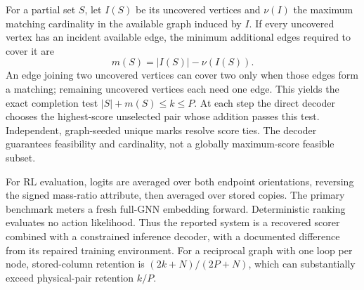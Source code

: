 For a partial set $S$, let $I(S)$ be its uncovered vertices and $\nu(I)$ the maximum matching cardinality in the available graph induced by $I$. If every uncovered vertex has an incident available edge, the minimum additional edges required to cover it are
\begin{equation}
 m(S)=|I(S)|-\nu(I(S)).
\end{equation}
An edge joining two uncovered vertices can cover two only when those edges form a matching; remaining uncovered vertices each need one edge. This yields the exact completion test $|S|+m(S)\le k\le P$. At each step the direct decoder chooses the highest-score unselected pair whose addition passes this test. Independent, graph-seeded unique marks resolve score ties. The decoder guarantees feasibility and cardinality, not a globally maximum-score feasible subset.

For RL evaluation, logits are averaged over both endpoint orientations, reversing the signed mass-ratio attribute, then averaged over stored copies. The primary benchmark meters a fresh full-GNN embedding forward. Deterministic ranking evaluates no action likelihood. Thus the reported system is a recovered scorer combined with a constrained inference decoder, with a documented difference from its repaired training environment. For a reciprocal graph with one loop per node, stored-column retention is $(2k+N)/(2P+N)$, which can substantially exceed physical-pair retention $k/P$.
